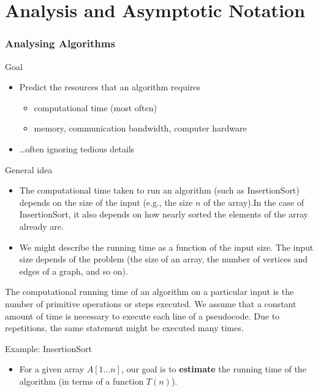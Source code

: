 \section{Analysis and Asymptotic Notation}

\begin{frame}
  \frametitle{Analysing Algorithms}

  \begin{block}{Goal}
    \begin{itemize}
     \item Predict the resources that an algorithm requires
       \begin{itemize}
         \item computational time \pause (most often)
         \item memory, communication bandwidth, computer hardware\pause
       \end{itemize}
     \item \ldots often ignoring tedious details
     \end{itemize}  
  \end{block}
\end{frame}

\begin{frame}
    \begin{block}{General idea}
      \begin{itemize}
       \item The computational time taken to run an algorithm (such as
       InsertionSort) depends on the size of the input (e.g., the size $n$
       of the array).\pause In the case of InsertionSort,
       it also depends on how nearly sorted the elements of the array already are.

       \item We might describe the running time as a function of the input size.
         The input size depends of the problem (the size of an array, the number of
          vertices and edges of a graph, and so on). 

    \end{itemize}
  \end{block}  

\end{frame}

\begin{frame}
  The computational running time of an algorithm on a particular input is the
  number of primitive operations or steps executed. \pause We
  assume that a constant amount of time is necessary to
  execute each line of a pseudocode. \pause Due to repetitions, the
  same statement might be executed many times. 

  \begin{block}{Example: InsertionSort}
    \begin{itemize}
    \item For a given array $A[1 \ldots n]$, our goal is to
      {\bf estimate} the running time of the algorithm (in terms of
      a function $T(n)$). 
    \end{itemize}
  \end{block}
\end{frame}


